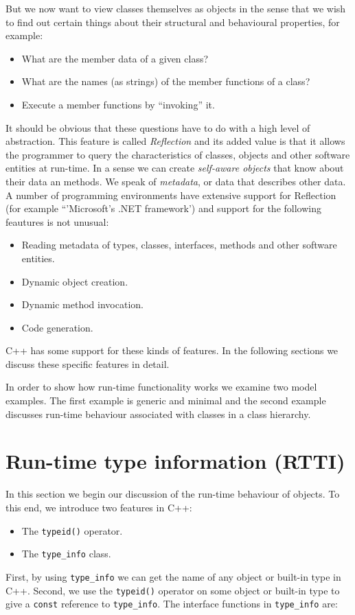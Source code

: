 But we now want to view classes themselves as objects in the sense that we wish to find out certain things about their structural and behavioural properties, for example:
\begin{itemize}
	\item What are the member data of a given class?
	\item What are the names (as strings) of the member functions of a class?
	\item Execute a member functions by ``invoking'' it.
\end{itemize}
It should be obvious that these questions have to do with a high level of abstraction. This feature is called \emph{Reflection} and its added value is that it allows the programmer to query the characteristics of classes, objects and other software entities at run-time. In a sense we can create \emph{self-aware objects} that know about their data an methods. We speak of \emph{metadata}, or data that describes other data. A number of programming environments have extensive support for Reflection (for example ``'Microsoft's .NET framework') and support for the following feautures is not unusual:
\begin{itemize}
	\item Reading metadata of types, classes, interfaces, methods and other software entities.
	\item Dynamic object creation.
	\item Dynamic method invocation.
	\item Code generation.
\end{itemize}

C++ has some support for these kinds of features. In the following sections we discuss these specific features in detail.

In order to show how run-time functionality works we examine two model examples. The first example is generic and minimal and the second example discusses run-time behaviour associated with classes in a class hierarchy.

\section{Run-time type information (RTTI)}

In this section we begin our discussion of the run-time behaviour of objects. To this end, we introduce two features in C++:
\begin{itemize}
	\item The \texttt{typeid()} operator.
	\item The \texttt{type\_info} class.
\end{itemize}
First, by using \texttt{type\_info} we can get the name of any object or built-in type in C++. Second, we use the \texttt{typeid()} operator on some object or built-in type to give a \texttt{const} reference to \texttt{type\_info}. The interface functions in \texttt{type\_info} are:

